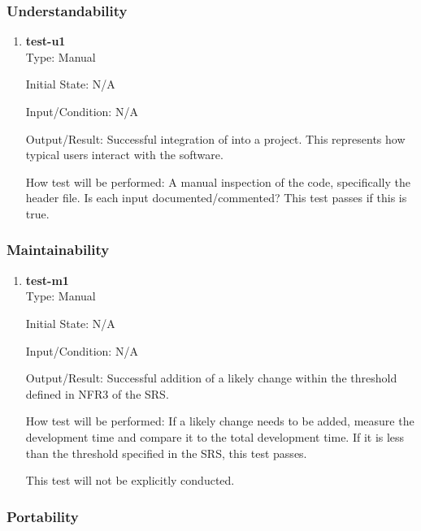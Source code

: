 \documentclass[12pt, titlepage]{article}
\newcommand{\Tthetestnum}{T\thetestnum}
\begin{document}
\subsubsection{Understandability}

\begin{enumerate}

\item[\refstepcounter{testnum} \Tthetestnum \label{t:u1}:] \textbf{test-u1} \\

    Type: Manual

    Initial State: N/A

    Input/Condition: N/A

    Output/Result: Successful integration of \progname{} into a project. This represents how typical
    users interact with the software.

    How test will be performed: A manual inspection of the code, specifically the header file. Is
    each input documented/commented? This test passes if this is true.
\end{enumerate}

\subsubsection{Maintainability}

\begin{enumerate}

\item[\refstepcounter{testnum} \Tthetestnum \label{t:m1}:] \textbf{test-m1} \\

    Type: Manual

    Initial State: N/A

    Input/Condition: N/A

    Output/Result: Successful addition of a likely change within the threshold defined in NFR3 of
    the SRS.

    How test will be performed: If a likely change needs to be added, measure the development time
    and compare it to the total development time. If it is less than the threshold specified in the
    SRS, this test passes.

    This test will not be explicitly conducted.
\end{enumerate}

\subsubsection{Portability}
\end{document}
